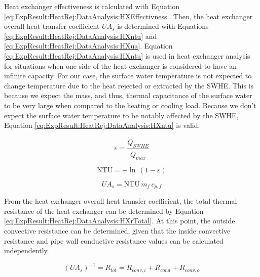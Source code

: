 Heat exchanger effectiveness is calculated with Equation \ref{eq:ExpResult:HeatRej:DataAnalysis:HXEffectivness}. Then, the heat exchanger overall heat transfer coefficient $U A_s$ is determined with Equations \ref{eq:ExpResult:HeatRej:DataAnalysis:HXntu} and \ref{eq:ExpResult:HeatRej:DataAnalysis:HXua}. Equation \ref{eq:ExpResult:HeatRej:DataAnalysis:HXntu} is used in heat exchanger analysis for situations when one side of the heat exchanger is considered to have an infinite capacity. For our case, the surface water temperature is not expected to change temperature due to the heat rejected or extracted by the SWHE. This is because we expect the mass, and thus, thermal capacitance of the surface water to be very large when compared to the heating or cooling load. Because we don't expect the surface water temperature to be notably affected by the SWHE, Equation \ref{eq:ExpResult:HeatRej:DataAnalysis:HXntu} is valid.

	\begin{equation}
		\varepsilon=\frac{\dot{Q}_{SWHE}}{\dot{Q}_{max}}
		\label{eq:ExpResult:HeatRej:DataAnalysis:HXEffectivness}
	\end{equation}
	
	\begin{equation}
		\mbox{NTU} = - \ln \, (1-\varepsilon)
		\label{eq:ExpResult:HeatRej:DataAnalysis:HXntu}
	\end{equation}
	
	\begin{equation}
		UA_s=\mbox{NTU} \, \dot{m}_f \, c_{p,f}
		\label{eq:ExpResult:HeatRej:DataAnalysis:HXua}
	\end{equation}
	
From the heat exchanger overall heat transfer coefficient, the total thermal resistance of the heat exchanger can be determined by Equation \ref{eq:ExpResult:HeatRej:DataAnalysis:HXrTotal}. At this point, the outside convective resistance can be determined, given that the inside convective resistance and pipe wall conductive resistance values can be calculated independently.

	\begin{equation}
		(UA_s)^{-1}=R_{tot}=R_{conv,i}+R_{cond}+R_{conv,o}
		\label{eq:ExpResult:HeatRej:DataAnalysis:HXrTotal}
	\end{equation}
	
